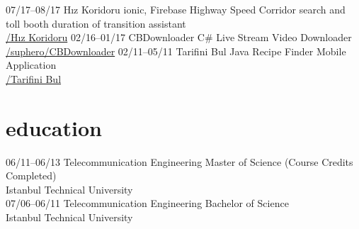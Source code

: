 \documentclass[]{../friggeri-cv} %
\begin{document}
\begin{entrylist}
\entry
{07/17--08/17}
{Hız Koridoru}
{ionic, Firebase}
{Highway Speed Corridor search and toll booth duration of transition assistant
\\\href{https://play.google.com/store/apps/details?id=com.harunsokullu.speedcorridor}{\faAndroid/Hız Koridoru}}
\entry
{02/16--01/17}
{CBDownloader}
{C\#}
{Live Stream Video Downloader
\\\href{https://github.com/suphero/CBDownloader}{\faGithub/suphero/CBDownloader}}
\entry
{02/11--05/11}
{Tarifini Bul}
{Java}
{Recipe Finder Mobile Application
\\\href{https://play.google.com/store/apps/details?id=com.tarifinibul}{\faAndroid/Tarifini Bul}}

\end{entrylist}

\section{education}

\begin{entrylist}

\entry
{06/11--06/13}
{Telecommunication Engineering}{}
{Master of Science (Course Credits Completed)
\\Istanbul Technical University}
\\
\entry
{07/06--06/11}
{Telecommunication Engineering}{}
{Bachelor of Science
\\Istanbul Technical University}
	
\end{entrylist}
\end{document}
